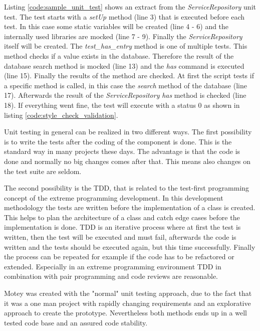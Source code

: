 Listing \ref{code:sample_unit_test} shows an extract from the \textit{ServiceRepository} unit test.
The test starts with a \textit{setUp} method (line 3) that is executed before each test.
In this case some static variables will be created (line 4 - 6) and the internally used libraries are mocked (line 7 - 9).
Finally the \textit{ServiceRepository} itself will be created.
The \textit{test\_has\_entry} method is one of multiple tests.
This method checks if a value exists in the database.
Therefore the result of the database search method is mocked (line 13) and the \textit{has} command is executed (line 15).
Finally the results of the method are checked.
At first the script tests if a specific method is called, in this case the \textit{search} method of the database (line 17).
Afterwards the result of the \textit{ServiceRepository} \textit{has} method is checked (line 18).
If everything went fine, the test will execute with a status 0 as shown in listing \ref{code:style_check_validation}.

Unit testing in general can be realized in two different ways.
The first possibility is to write the tests after the coding of the component is done.
This is the standard way in many projects these days.
The advantage is that the code is done and normally no big changes comes after that.
This means also changes on the test suite are seldom.

The second possibility is the \ac{TDD}, that is related to the test-first programming concept of the extreme programming development.
In this development methodology the tests are written before the implementation of a class is created.
This helps to plan the architecture of a class and catch edge cases before the implementation is done.
\ac{TDD} is an iterative process where at first the test is written, then the test will be executed and must fail, afterwards the code is written and the tests should be executed again, but this time successfully.
Finally the process can be repeated for example if the code has to be refactored or extended.
Especially in an extreme programming environment \ac{TDD} in combination with pair programming and code reviews are reasonable.\newline

Motey was created with the "normal" unit testing approach, due to the fact that it was a one man project with rapidly changing requirements and an explorative approach to create the prototype.
Nevertheless both methods ends up in a well tested code base and an assured code stability.
